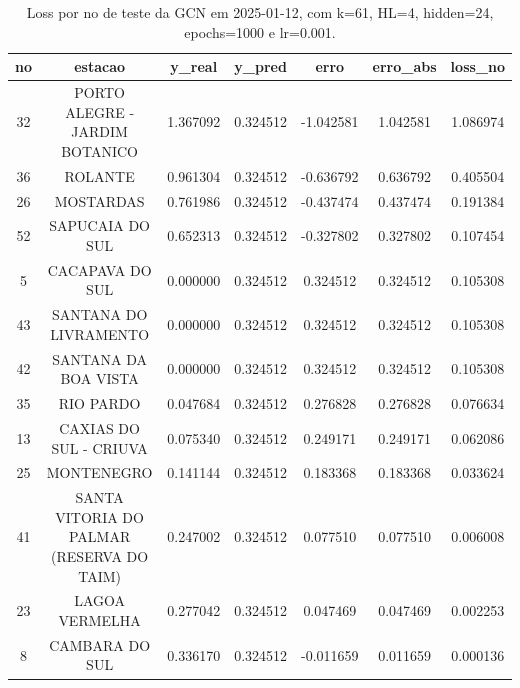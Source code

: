 \begin{table}[h]
\centering
\caption{Loss por no de teste da GCN em 2025-01-12, com k=61, HL=4, hidden=24, epochs=1000 e lr=0.001.}
\label{tab:gcn_loss_k61_hl4_h24_e1000_d20250112}
\begin{tabular}{ccccccc}
\toprule
no & estacao & y\_real & y\_pred & erro & erro\_abs & loss\_no \\
\midrule
32 & PORTO ALEGRE - JARDIM BOTANICO & 1.367092 & 0.324512 & -1.042581 & 1.042581 & 1.086974 \\
36 & ROLANTE & 0.961304 & 0.324512 & -0.636792 & 0.636792 & 0.405504 \\
26 & MOSTARDAS & 0.761986 & 0.324512 & -0.437474 & 0.437474 & 0.191384 \\
52 & SAPUCAIA DO SUL & 0.652313 & 0.324512 & -0.327802 & 0.327802 & 0.107454 \\
5 & CACAPAVA DO SUL & 0.000000 & 0.324512 & 0.324512 & 0.324512 & 0.105308 \\
43 & SANTANA DO LIVRAMENTO & 0.000000 & 0.324512 & 0.324512 & 0.324512 & 0.105308 \\
42 & SANTANA DA BOA VISTA & 0.000000 & 0.324512 & 0.324512 & 0.324512 & 0.105308 \\
35 & RIO PARDO & 0.047684 & 0.324512 & 0.276828 & 0.276828 & 0.076634 \\
13 & CAXIAS DO SUL - CRIUVA & 0.075340 & 0.324512 & 0.249171 & 0.249171 & 0.062086 \\
25 & MONTENEGRO & 0.141144 & 0.324512 & 0.183368 & 0.183368 & 0.033624 \\
41 & SANTA VITORIA DO PALMAR (RESERVA DO TAIM) & 0.247002 & 0.324512 & 0.077510 & 0.077510 & 0.006008 \\
23 & LAGOA VERMELHA & 0.277042 & 0.324512 & 0.047469 & 0.047469 & 0.002253 \\
8 & CAMBARA DO SUL & 0.336170 & 0.324512 & -0.011659 & 0.011659 & 0.000136 \\
\bottomrule
\end{tabular}
\end{table}
